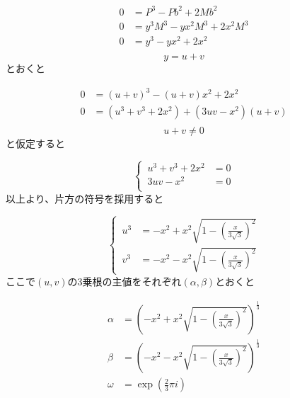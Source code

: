 \documentclass[dvipdfmx]{report} %
\begin{document}
\begin{equation*}
\begin{split}
	0 &= P^3 - Pb^2 + 2Mb^2\\
	0 &= y^3M^3 - yx^2M^3 + 2x^2M^3\\
	0 &= y^3 - yx^2 + 2x^2\\
\end{split}
\end{equation*}
\[ y = u + v \]
とおくと

\begin{equation*}
\begin{split}
	0 &= ( u + v )^3 - ( u + v ) x^2 + 2 x^2\\
	0 &= (u^3 + v^3 + 2 x^2) + ( 3uv - x^2 )( u + v ) \\
\end{split}
\end{equation*}
\[ u + v \neq 0 \] と仮定すると

\begin{equation}
\left\{ \,
\begin{aligned}
	u^3 + v^3 + 2 x^2 &= 0\\
	3uv - x^2 &= 0\\
\end{aligned}
\right.
\end{equation}
以上より、片方の符号を採用すると

\begin{equation}
\left\{ \,
\begin{aligned}
	u^3 &= - x^2 + x^2 \sqrt{ 1 - \left( \frac{ x }{ 3\sqrt{3} } \right)^2 }\\
	v^3 &= - x^2 - x^2 \sqrt{ 1 - \left( \frac{ x }{ 3\sqrt{3} } \right)^2 }
\end{aligned}
\right.
\end{equation}
ここで$(u, v)$の3乗根の主値をそれぞれ$(\alpha, \beta)$とおくと

\begin{equation*}
\begin{split}
	\alpha &= \left( - x^2 + x^2 \sqrt{ 1 - \left( \frac{ x }{ 3\sqrt{3} } \right)^2 } \right) ^{\frac{1}{3}}\\
	\beta &= \left( - x^2 - x^2 \sqrt{ 1 - \left( \frac{ x }{ 3\sqrt{3} } \right)^2 } \right) ^{\frac{1}{3}}\\
	\omega &= \exp \left(\frac{2}{3} \pi i \right)
\end{split}
\end{equation*}
\end{document}
